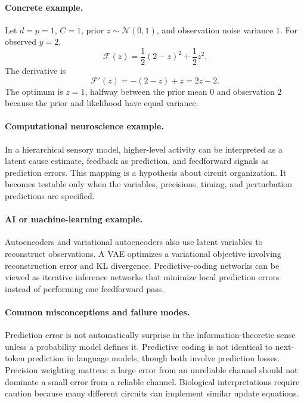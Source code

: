 \paragraph{Concrete example.}
Let \(d=p=1\), \(C=1\), prior \(z\sim\mathcal N(0,1)\), and observation noise variance \(1\). For observed \(y=2\),
\[
\mathcal F(z)=\frac12(2-z)^2+\frac12 z^2.
\]
The derivative is
\[
\mathcal F'(z)=-(2-z)+z=2z-2.
\]
The optimum is \(z=1\), halfway between the prior mean \(0\) and observation \(2\) because the prior and likelihood have equal variance.

\paragraph{Computational neuroscience example.}
In a hierarchical sensory model, higher-level activity can be interpreted as a latent cause estimate, feedback as prediction, and feedforward signals as prediction errors. This mapping is a hypothesis about circuit organization. It becomes testable only when the variables, precisions, timing, and perturbation predictions are specified.

\paragraph{AI or machine-learning example.}
Autoencoders and variational autoencoders also use latent variables to reconstruct observations. A VAE optimizes a variational objective involving reconstruction error and KL divergence. Predictive-coding networks can be viewed as iterative inference networks that minimize local prediction errors instead of performing one feedforward pass.

\paragraph{Common misconceptions and failure modes.}
Prediction error is not automatically surprise in the information-theoretic sense unless a probability model defines it. Predictive coding is not identical to next-token prediction in language models, though both involve prediction losses. Precision weighting matters: a large error from an unreliable channel should not dominate a small error from a reliable channel. Biological interpretations require caution because many different circuits can implement similar update equations.

